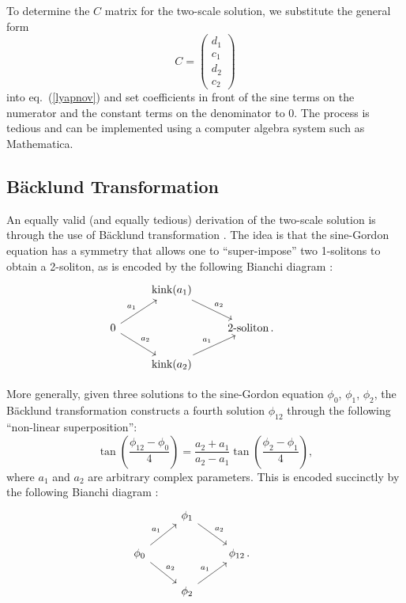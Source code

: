 \documentclass[11pt]{book}
\begin{document}
To determine the $C$ matrix for the two-scale solution, we substitute the general form
\begin{equation}
  C = \left(\begin{array}{c}
    d_1\\
    c_1\\
    d_2\\
    c_2
  \end{array}\right)
\end{equation}
into eq.~(\ref{lyapnov}) and set coefficients in front of the sine terms on the numerator and the constant terms on the denominator to 0. The process is tedious and can be implemented using a computer algebra system such as Mathematica.

\subsection{B\"acklund Transformation}
An equally valid (and equally tedious) derivation of the two-scale solution is through the use of B\"acklund transformation \cite{Dodd499, hietarinta1997introduction, Cuenda20111047}. The idea is that the sine-Gordon equation has a symmetry that allows one to ``super-impose'' two 1-solitons to obtain a 2-soliton, as is encoded by the following Bianchi diagram \cite{Cuenda20111047}:
\[
\begin{tikzcd}
  & \text{kink}(a_1) \arrow{dr}{a_2} &&\\
  0\arrow{ur}{a_1}\arrow{dr}{a_2}&&\text{2-soliton\,.}&\\
 &\text{kink}(a_2)\arrow{ur}{a_1}&&
\end{tikzcd}
\]

More generally, given three solutions to the sine-Gordon equation $\phi_0$, $\phi_1$, $\phi_2$, the B\"acklund transformation constructs a fourth solution $\phi_{12}$ through the following ``non-linear superposition'':
\begin{equation}
  \tan \left(\frac{\phi_{12}-\phi_0}{4}\right) = \frac{a_2+a_1}{a_2-a_1} \tan \left(\frac{\phi_2-\phi_1}{4}\right),
\end{equation}
where $a_1$ and $a_2$ are arbitrary complex parameters. This is encoded succinctly by the following Bianchi diagram \cite{Cuenda20111047}:
\begin{equation}\label{bianchi}
\begin{tikzcd}
  & \phi_1 \arrow{dr}{a_2} &&\\
  \phi_0\arrow{ur}{a_1}\arrow{dr}{a_2}&&\phi_{12}\,.&\\
 &\phi_2\arrow{ur}{a_1}&&
\end{tikzcd}
\end{equation}
\end{document}
